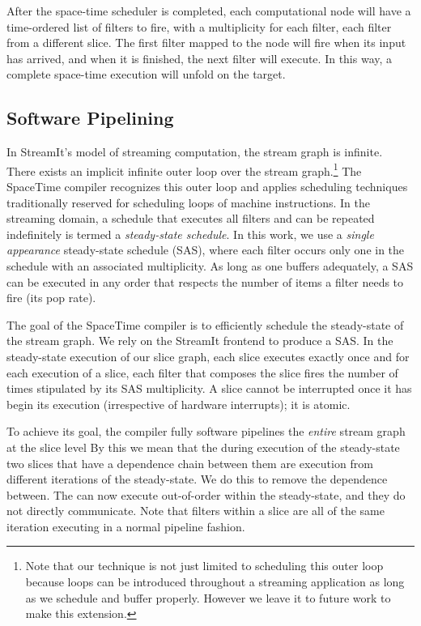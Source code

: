 After the space-time scheduler is completed, each computational node
will have a time-ordered list of filters to fire, with a multiplicity
for each filter, each filter from a different slice.  The first
filter mapped to the node will fire when its input has arrived, and
when it is finished, the next filter will execute.  In this way, a
complete space-time execution will unfold on the target.

\subsection{Software Pipelining}
In StreamIt's model of streaming computation, the stream graph is
infinite.  There exists an implicit infinite outer loop over the
stream graph.\footnote{Note that our technique is not just limited to
scheduling this outer loop because loops can be introduced throughout
a streaming application as long as we schedule and buffer properly.
However we leave it to future work to make this extension.}  The
SpaceTime compiler recognizes this outer loop and applies scheduling
techniques traditionally reserved for scheduling loops of machine
instructions.  In the streaming domain, a schedule that executes all
filters and can be repeated indefinitely is termed a {\it steady-state
schedule}.  In this work, we use a {\it single appearance}
steady-state schedule (SAS), where each filter occurs only one in the
schedule with an associated multiplicity.  As long as one buffers
adequately, a SAS can be executed in any order that respects the
number of items a filter needs to fire (its pop rate).

The goal of the SpaceTime compiler is to efficiently schedule the
steady-state of the stream graph.  We rely on the StreamIt frontend to
produce a SAS.  In the steady-state execution of our slice graph, each
slice executes exactly once and for each execution of a slice, each
filter that composes the slice fires the number of times stipulated
by its SAS multiplicity.  A slice cannot be interrupted once it has
begin its execution (irrespective of hardware interrupts); it is
atomic.

To achieve its goal, the compiler fully software pipelines the {\it
entire} stream graph at the slice level By this we mean that the
during execution of the steady-state two slices that have a dependence
chain between them are execution from different iterations of the
steady-state.  We do this to remove the dependence between.  The can
now execute out-of-order within the steady-state, and they do not
directly communicate.  Note that filters within a slice are all of the
same iteration executing in a normal pipeline fashion.  

